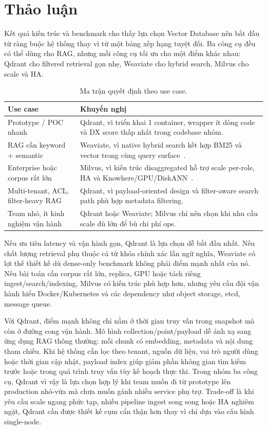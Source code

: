 \section{Thảo luận}
\label{sec:discussion}

Kết quả kiến trúc và benchmark cho thấy lựa chọn Vector Database nên bắt đầu từ ràng buộc hệ thống thay vì từ một bảng xếp hạng tuyệt đối. Ba công cụ đều có thể dùng cho RAG, nhưng mỗi công cụ tối ưu cho một điểm khác nhau: Qdrant cho filtered retrieval gọn nhẹ, Weaviate cho hybrid search, Milvus cho scale và HA.

\begin{table}[H]
\centering
\caption{Ma trận quyết định theo use case.}
\label{tab:decision-matrix}
\begin{tabularx}{\textwidth}{p{3.6cm}X}
\toprule
\textbf{Use case} & \textbf{Khuyến nghị} \\
\midrule
Prototype / POC nhanh & Qdrant, vì triển khai 1 container, wrapper ít dòng code và DX score thấp nhất trong codebase nhóm. \\
RAG cần keyword + semantic & Weaviate, vì native hybrid search kết hợp BM25 và vector trong cùng query surface~\cite{weaviatehybrid}. \\
Enterprise hoặc corpus rất lớn & Milvus, vì kiến trúc disaggregated hỗ trợ scale per-role, HA và Knowhere/GPU/DiskANN~\cite{milvusarch}. \\
Multi-tenant, ACL, filter-heavy RAG & Qdrant, vì payload-oriented design và filter-aware search path phù hợp metadata filtering. \\
Team nhỏ, ít kinh nghiệm vận hành & Qdrant hoặc Weaviate; Milvus chỉ nên chọn khi nhu cầu scale đủ lớn để bù chi phí ops. \\
\bottomrule
\end{tabularx}
\end{table}

Nếu ưu tiên latency và vận hành gọn, Qdrant là lựa chọn dễ bắt đầu nhất. Nếu chất lượng retrieval phụ thuộc cả từ khóa chính xác lẫn ngữ nghĩa, Weaviate có lợi thế thiết kế dù dense-only benchmark không phải điểm mạnh nhất của nó. Nếu bài toán cần corpus rất lớn, replica, GPU hoặc tách riêng ingest/search/indexing, Milvus có kiến trúc phù hợp hơn, nhưng yêu cầu đội vận hành hiểu Docker/Kubernetes và các dependency như object storage, etcd, message queue.

Với Qdrant, điểm mạnh không chỉ nằm ở thời gian truy vấn trong snapshot mà còn ở đường cong vận hành. Mô hình collection/point/payload dễ ánh xạ sang ứng dụng RAG thông thường: mỗi chunk có embedding, metadata và nội dung tham chiếu. Khi hệ thống cần lọc theo tenant, nguồn dữ liệu, vai trò người dùng hoặc thời gian cập nhật, payload index giúp giảm phần không gian tìm kiếm trước hoặc trong quá trình truy vấn tùy kế hoạch thực thi. Trong nhóm ba công cụ, Qdrant vì vậy là lựa chọn hợp lý khi team muốn đi từ prototype lên production nhỏ-vừa mà chưa muốn gánh nhiều service phụ trợ. Trade-off là khi yêu cầu scale ngang phức tạp, nhiều pipeline ingest song song hoặc HA nghiêm ngặt, Qdrant cần được thiết kế cụm cẩn thận hơn thay vì chỉ dựa vào cấu hình single-node.

